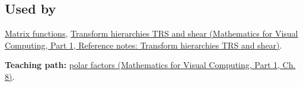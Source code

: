 \subsection{Used by}\label{appendix-73f5bcf7a462-used-by}

\hypertarget{appendix-73f5bcf7a462-used-by}{}

\hyperref[appendix-0f4bc2bf2b1f]{Matrix functions}, \href{../02-Mathematics-for-Visual-Computing-P01/main.pdf\#nameddest=appendix-292c061cd47c}{Transform hierarchies TRS and shear (Mathematics for Visual Computing, Part 1, Reference notes: Transform hierarchies TRS and shear)}.

\textbf{Teaching path:} \href{../02-Mathematics-for-Visual-Computing-P01/main.pdf\#nameddest=02-foundations-ii-ch024-polar-decomposition-separates-rotation-like-motion-from-stretch}{polar factors (Mathematics for Visual Computing, Part 1, Ch. 8)}.
